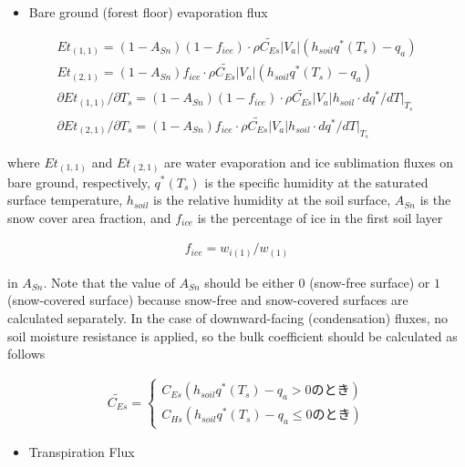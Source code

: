 \begin{itemize}
\tightlist
\item
  Bare ground (forest floor) evaporation flux
\end{itemize}

\begin{eqnarray}
 Et_{(1,1)} = (1-A_{Sn})(1-f_{ice})\cdot
           \rho \widetilde{C_{Es}}|V_a|(h_{soil}q^*(T_s) - q_a) \\
 Et_{(2,1)} = (1-A_{Sn})f_{ice}\cdot
           \rho \widetilde{C_{Es}}|V_a|(h_{soil}q^*(T_s) - q_a) \\
 \partial Et_{(1,1)}/\partial T_s = (1-A_{Sn})(1-f_{ice})\cdot
           \rho \widetilde{C_{Es}}|V_a|h_{soil}\cdot dq^*/dT |_{T_s} \\
 \partial Et_{(2,1)}/\partial T_s = (1-A_{Sn})f_{ice}\cdot
           \rho \widetilde{C_{Es}}|V_a|h_{soil}\cdot dq^*/dT |_{T_s}
\end{eqnarray}

where \(Et_{(1,1)}\) and \(Et_{(2,1)}\) are water evaporation and ice
sublimation fluxes on bare ground, respectively, \(q^*(T_s)\) is the
specific humidity at the saturated surface temperature, \(h_{soil}\) is
the relative humidity at the soil surface, \(A_{Sn}\) is the snow cover
area fraction, and \(f_{ice}\) is the percentage of ice in the first
soil layer

\begin{eqnarray}
  f_{ice} = w_{i(1)}/w_{(1)}
\end{eqnarray}

in \(A_{Sn}\). Note that the value of \(A_{Sn}\) should be either \(0\)
(snow-free surface) or \(1\) (snow-covered surface) because snow-free
and snow-covered surfaces are calculated separately. In the case of
downward-facing (condensation) fluxes, no soil moisture resistance is
applied, so the bulk coefficient should be calculated as follows

\begin{eqnarray}
  \widetilde{C_{Es}} = \left\{
  \begin{array}{ll}
   C_{Es} (h_{soil}q^*(T_s) - q_a > 0 {のとき})\\
   C_{Hs} (h_{soil}q^*(T_s) - q_a \leq 0 {のとき})
  \end{array}
  \right.
\end{eqnarray}

\begin{itemize}
\tightlist
\item
  Transpiration Flux
\end{itemize}

